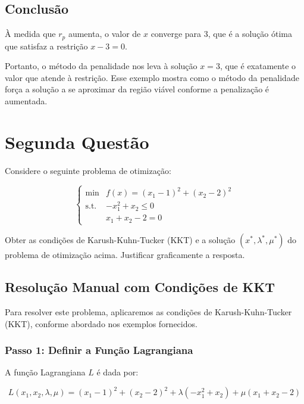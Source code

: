 \documentclass[a4paper, 12pt]{article}
\begin{document}
\subsection{Conclusão}
À medida que $r_p$ aumenta, o valor de $x$ converge para 3, que é a solução ótima que satisfaz a restrição $x - 3 = 0$.

Portanto, o método da penalidade nos leva à solução $x = 3$, que é exatamente o valor que atende à restrição. Esse exemplo mostra como o método da penalidade força a solução a se aproximar da região viável conforme a penalização é aumentada.

\section{Segunda Questão}

Considere o seguinte problema de otimização:

\begin{equation*}
    \begin{cases}
        \text{min} & f(x) = (x_1 - 1)^2 + (x_2 - 2)^2 \\
        \text{s.t.} & -x_1^2 + x_2 \leq 0 \\
                   & x_1 + x_2 - 2 = 0
    \end{cases}
\end{equation*}

Obter as condições de Karush-Kuhn-Tucker (KKT) e a solução $(x^*, \lambda^*, \mu^*)$ do problema de otimização acima. Justificar graficamente a resposta.

\subsection{Resolução Manual com Condições de KKT}

Para resolver este problema, aplicaremos as condições de Karush-Kuhn-Tucker (KKT), conforme abordado nos exemplos fornecidos.

\subsubsection{Passo 1: Definir a Função Lagrangiana}

A função Lagrangiana $L$ é dada por:

\begin{equation*}
    L(x_1, x_2, \lambda, \mu) = (x_1 - 1)^2 + (x_2 - 2)^2 + \lambda (-x_1^2 + x_2) + \mu (x_1 + x_2 - 2)
\end{equation*}
\end{document}

